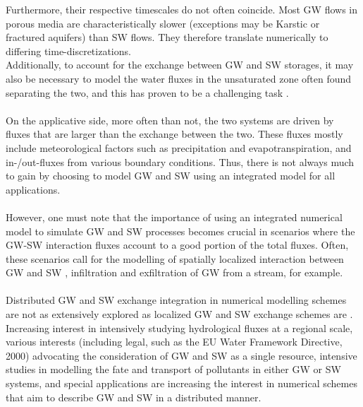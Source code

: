 Furthermore, their respective timescales do not often coincide. Most GW flows in porous media are characteristically slower (exceptions may be Karstic or fractured aquifers) than SW flows. They therefore translate numerically to differing time-discretizations.
\\
Additionally, to account for the exchange between GW and SW storages, it may also be necessary to model the water fluxes in the unsaturated zone often found separating the two, and this has proven to be a challenging task \cite{Short1995}.
\\ \\
On the applicative side, more often than not, the two systems are driven by fluxes that are larger than the exchange between the two. These fluxes mostly include meteorological factors such as precipitation and evapotranspiration, and in-/out-fluxes from various boundary conditions. Thus, there is not always much to gain by choosing to model GW and SW using an integrated model for all applications.
\\ \\
However, one must note that the importance of using an integrated numerical model to simulate GW and SW processes becomes crucial in scenarios where the GW-SW interaction fluxes account to a good portion of the total fluxes. Often, these scenarios call for the modelling of spatially localized interaction between GW and SW \cite{Winter1998}, infiltration and exfiltration of GW from a stream, for example.
\\ \\
Distributed GW and SW exchange integration in numerical modelling schemes are not as extensively explored as localized GW and SW exchange schemes are \cite{Shen2010}. Increasing interest in intensively studying hydrological fluxes at a regional scale, various interests (including legal, such as the EU Water Framework Directive, 2000) advocating the consideration of GW and SW as a single resource, intensive studies in modelling the fate and transport of pollutants in either GW or SW systems, and special applications are increasing the interest \cite{Fleckenstein2010} in numerical schemes that aim to describe GW and SW in a distributed manner.


